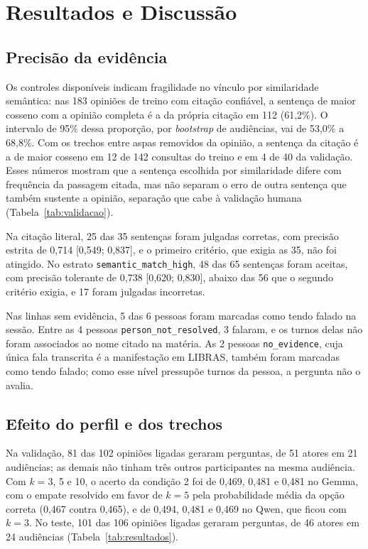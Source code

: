 \section{Resultados e Discuss\~ao}
\label{sec:resultados}

\subsection{Precisão da evidência}
\label{sec:resultados-udv}

Os controles disponíveis indicam fragilidade no vínculo por similaridade semântica: nas 183 opiniões
de treino com citação confiável, a sentença de maior cosseno com a opinião completa é a da própria
citação em 112 (61,2\%). O intervalo de 95\% dessa proporção, por \textit{bootstrap} de audiências,
vai de 53,0\% a 68,8\%. Com os trechos entre aspas removidos da opinião, a sentença da citação é a
de maior cosseno em 12 de 142 consultas do treino e em 4 de 40 da validação. Esses números mostram
que a sentença escolhida por similaridade difere com frequência da passagem citada, mas não separam
o erro de outra sentença que também sustente a opinião, separação que cabe à validação humana
(Tabela~\ref{tab:validacao}).



Na citação literal, 25 das 35 sentenças foram julgadas corretas, com precisão estrita de 0,714
[0,549; 0,837], e o primeiro critério, que exigia as 35, não foi atingido. No estrato
\texttt{semantic\_match\_high}, 48 das 65 sentenças foram aceitas, com precisão tolerante de 0,738
[0,620; 0,830], abaixo das 56 que o segundo critério exigia, e 17 foram julgadas incorretas.

Nas linhas sem evidência, 5 das 6 pessoas foram marcadas como tendo falado na sessão. Entre as 4
pessoas \texttt{person\_not\_resolved}, 3 falaram, e os turnos delas não foram associados ao nome
citado na matéria. As 2 pessoas \texttt{no\_evidence}, cuja única fala transcrita é a manifestação em
LIBRAS, também foram marcadas como tendo falado; como esse nível pressupõe turnos da pessoa, a
pergunta não o avalia.

\subsection{Efeito do perfil e dos trechos}
\label{sec:resultados-simulacao}



Na validação, 81 das 102 opiniões ligadas geraram perguntas, de 51 atores em 21 audiências; as
demais não tinham três outros participantes na mesma audiência. Com $k = 3$, 5 e 10, o acerto da
condição 2 foi de 0,469, 0,481 e 0,481 no Gemma, com o empate resolvido em favor de $k = 5$ pela
probabilidade média da opção correta (0,467 contra 0,465), e de 0,494, 0,481 e 0,469 no Qwen, que
ficou com $k = 3$. No teste, 101 das 106 opiniões ligadas geraram perguntas, de 46 atores em 24
audiências (Tabela~\ref{tab:resultados}).


